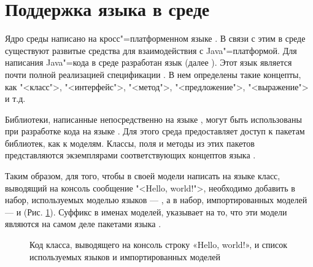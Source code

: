 \section{Поддержка языка  в среде \MPS{}}
Ядро среды \MPS{} написано на кросс"=платформенном языке  \cite{eckel}. В связи с этим в среде \MPS{} существуют развитые средства для взаимодействия с Java"=платформой. Для написания Java"=кода в среде \MPS{} разработан язык  (далее ). Этот язык является почти полной реализацией спецификации  \cite{java5spec}. В нем определены такие концепты, как "<класс">, "<интерфейс">, "<метод">, "<предложение">, "<выражение"> и т.д.

Библиотеки, написанные непосредственно на языке , могут быть использованы при разработке кода на языке . Для этого среда \MPS{} предоставляет доступ к пакетам библиотек, как к моделям. Классы, поля и методы из этих пакетов представляются экземплярами соответствующих концептов языка .

Таким образом, для того, чтобы в своей модели написать на языке  класс, выводящий на консоль сообщение "<Hello, world!">, необходимо добавить в набор, используемых моделью языков --- , а в набор, импортированных моделей ---
 и 
(Рис. \ref{fig:Import}). Суффикс  в именах моделей, указывает на то, что эти модели являются на самом деле пакетами языка .
\begin{figure}
 \centering
 \caption{Код класса, выводящего на консоль строку «Hello, world!», и список используемых языков и импортированных моделей}
 \label{fig:Import}
\end{figure}
